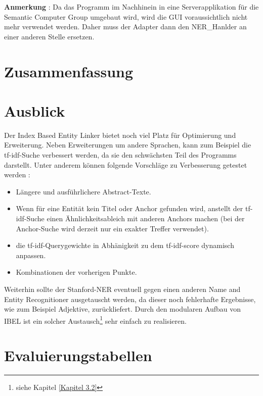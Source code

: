 \documentclass[11pt, a4paper, oneside]{Thesis} %
\begin{document}
\textbf{Anmerkung} : Da das Programm im Nachhinein in eine Serverapplikation f\"ur die Semantic Computer Group umgebaut wird, wird die GUI voraussichtlich nicht mehr verwendet werden. Daher muss der Adapter dann den NER\_Hanlder an einer anderen Stelle ersetzen.

\chapter{Zusammenfassung}
\chapter{Ausblick}
Der Index Based Entity Linker bietet noch viel Platz f\"ur Optimierung und Erweiterung. Neben Erweiterungen um andere Sprachen, kann zum Beispiel die tf-idf-Suche verbessert werden, da sie den schw\"achsten Teil des Programms darstellt. Unter anderem k\"onnen folgende Vorschl\"age zu Verbesserung getestet werden :
\begin{itemize}
\item L\"angere und ausf\"uhrlichere Abstract-Texte.
\item Wenn f\"ur eine Entit\"at kein Titel oder Anchor gefunden wird, anstellt der tf-idf-Suche einen \"Ahnlichkeitsableich mit anderen Anchors machen (bei der Anchor-Suche wird derzeit nur ein exakter Treffer verwendet).
\item die tf-idf-Querygewichte in Abh\"anigkeit zu dem tf-idf-score dynamisch anpassen.
\item Kombinationen der vorherigen Punkte.
\end{itemize}
Weiterhin sollte der Stanford-NER eventuell gegen einen anderen Name and Entity Recognitioner ausgetauscht werden, da dieser noch fehlerhafte Ergebnisse, wie zum Beispiel Adjektive, zur\"uckliefert. Durch den modularen Aufbau von IBEL ist ein solcher Austausch\footnote{siehe Kapitel \ref{Kapitel 3.2}} sehr einfach zu realisieren.






\appendix %
\chapter{Evaluierungstabellen}
\end{document}
